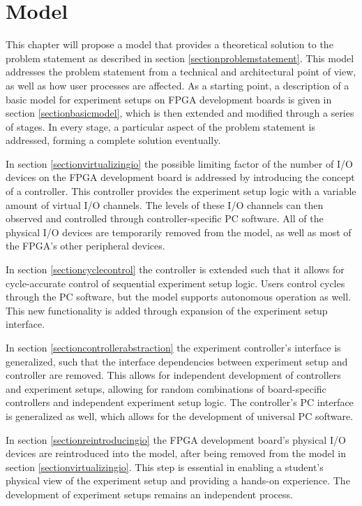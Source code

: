 \documentclass[openright]{uva-bachelor-thesis}
\begin{document}
% 
% 

\chapter{Model}

This chapter will propose a model that provides a theoretical solution to the problem statement as described in section \ref{sectionproblemstatement}. This model addresses the problem statement from a technical and architectural point of view, as well as how user processes are affected. As a starting point, a description of a basic model for experiment setups on FPGA development boards is given in section \ref{sectionbasicmodel}, which is then extended and modified through a series of stages. In every stage, a particular aspect of the problem statement is addressed, forming a complete solution eventually. 

In section \ref{sectionvirtualizingio} the possible limiting factor of the  number of I/O devices on the FPGA development board is addressed by introducing the concept of a controller. This controller provides the experiment setup logic with a variable amount of virtual I/O channels. The levels of these I/O channels can then observed and controlled through controller-specific PC software. All of the physical I/O devices are temporarily removed from the model, as well as most of the FPGA's other peripheral devices.

In section \ref{sectioncyclecontrol} the controller is extended such that it allows for cycle-accurate control of sequential experiment setup logic. Users control cycles through the PC software, but the model supports autonomous operation as well. This new functionality is added through expansion of the experiment setup interface.

In section \ref{sectioncontrollerabstraction} the experiment controller's interface is generalized, such that the interface dependencies between experiment setup and controller are removed. This allows for independent development of controllers and experiment setups, allowing for random combinations of board-specific controllers and independent experiment setup logic. The controller's PC interface is generalized as well, which allows for the development of universal PC software.

In section \ref{sectionreintroducingio} the FPGA development board's physical I/O devices are reintroduced into the model, after being removed from the model in section \ref{sectionvirtualizingio}. This step is essential in enabling a student's physical view of the experiment setup and providing a hands-on experience. The development of experiment setups remains an independent process.
\end{document}
